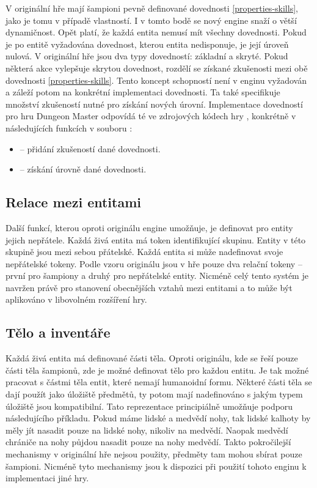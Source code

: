 V originální hře mají šampioni pevně definované dovednosti \vref{properties-skills}, jako je tomu v případě vlastností.
I v tomto bodě se nový engine snaží o větší dynamičnost. Opět platí, že každá entita nemusí mít všechny dovednosti.
Pokud je po entitě vyžadována dovednost, kterou entita nedisponuje, je její úroveň nulová.
V originální hře jsou dva typy dovedností: základní a skryté. Pokud některá akce vylepšuje skrytou dovednost,
rozdělí se získané zkušenosti mezi obě dovednosti \vref{properties-skills}. Tento koncept schopností není v enginu vyžadován a 
záleží potom na konkrétní implementaci dovednosti. Ta také specifikuje množství zkušeností nutné pro 
získání nových úrovní. Implementace dovedností pro hru Dungeon Master odpovídá té ve zdrojových kódech hry \cite{DMDecompilation},
konkrétně v následujících funkcích  v souboru :

\begin{itemize}
\item {} -- přidání zkušeností dané dovednosti.
\item {} -- získání úrovně dané dovednosti.
\end{itemize}

\subsection{Relace mezi entitami}
Další funkcí, kterou oproti originálu engine umožňuje, je definovat pro entity jejich nepřátele. Každá živá entita má token identifikující
skupinu. Entity v této skupině jsou mezi sebou přátelské. Každá entita si může nadefinovat svoje nepřátelské tokeny.
Podle vzoru originálu jsou v hře pouze dva relační tokeny -- první pro šampiony a druhý pro nepřátelské entity. Nicméně
celý tento systém je navržen právě pro stanovení obecnějších vztahů mezi entitami a to může být aplikováno v libovolném rozšíření hry.
 
\subsection{Tělo a inventáře}
Každá živá entita má definované části těla. Oproti originálu, kde se řeší pouze části těla šampionů,
zde je možné definovat tělo pro každou entitu. Je tak možné pracovat s částmi těla entit, které nemají humanoidní formu.
Některé části těla se dají použít jako úložiště předmětů, ty potom mají nadefinováno s jakým typem úložiště jsou kompatibilní.
Tato reprezentace principiálně umožňuje podporu následujícího příkladu. Pokud máme lidské a medvědí nohy, tak lidské
kalhoty by měly jít nasadit pouze na lidské nohy, nikoliv na medvědí. Naopak medvědí chrániče na nohy půjdou nasadit pouze na
nohy medvědí. Takto pokročilejší mechanismy v originální hře nejsou použity, předměty tam mohou sbírat pouze šampioni. Nicméně
tyto mechanismy jsou k dispozici při použití tohoto enginu k implementaci jiné hry.


